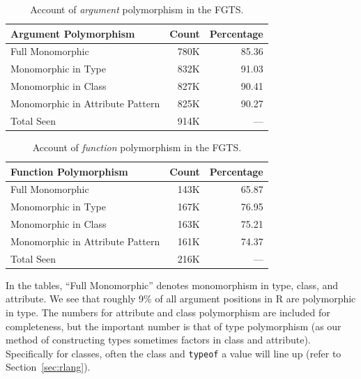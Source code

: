 \documentclass[acmsmall,10pt,review,anonymous]{acmart}\settopmatter{printfolios=true,printccs=false,printacmref=false}
\newcommand{\code}[1]{\lstinline|#1|\xspace}
\begin{document}
\begin{table}[ht]
\label{tab:argcountsFGTS}
\centering
\begin{tabular}{lrr}
  \hline
 Argument Polymorphism & Count & Percentage \\ 
  \hline
  Full Monomorphic & 780K & 85.36 \\ 
  Monomorphic in Type & 832K & 91.03 \\ 
  Monomorphic in Class & 827K & 90.41 \\ 
  Monomorphic in Attribute Pattern & 825K & 90.27 \\ 
  Total Seen & 914K & --- \\ 
     \hline
\end{tabular}
\caption{Account of {\it argument} polymorphism in the FGTS.}
\end{table}

\begin{table}[ht]
\label{tab:funcountsFGTS}
\centering
\begin{tabular}{lrr}
  \hline
 Function Polymorphism & Count & Percentage \\ 
  \hline
  Full Monomorphic & 143K & 65.87 \\ 
  Monomorphic in Type & 167K & 76.95 \\ 
  Monomorphic in Class & 163K & 75.21 \\ 
  Monomorphic in Attribute Pattern & 161K & 74.37 \\ 
  Total Seen & 216K & --- \\ 
   \hline
\end{tabular}
\caption{Account of {\it function} polymorphism in the FGTS.}
\end{table}


In the tables, ``Full Monomorphic'' denotes monomorphism in type, class, and attribute.
We see that roughly 9\% of all argument positions in R are polymorphic in type.
The numbers for attribute and class polymorphism are included for
completeness, but the important number is that of type polymorphism (as our
method of constructing types sometimes factors in class and attribute).
Specifically for classes, often the class and \code{typeof} a value will
line up (refer to Section~\ref{sec:rlang}).
\end{document}
